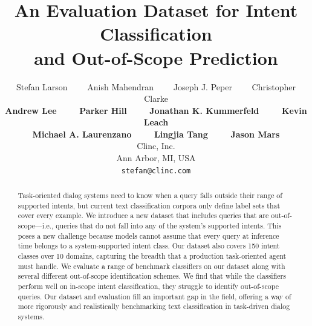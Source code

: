 \documentclass[11pt,a4paper]{article}
\title{An Evaluation Dataset for Intent Classification\\and Out-of-Scope Prediction}
\author{Stefan Larson ~~~~Anish Mahendran ~~~~Joseph J. Peper ~~~~Christopher Clarke\\ \textbf{Andrew Lee ~~~~Parker Hill ~~~~Jonathan K. Kummerfeld ~~~~Kevin Leach}\\
\textbf{Michael A. Laurenzano ~~~~Lingjia Tang ~~~~Jason Mars}\\
  Clinc, Inc.\\
  Ann Arbor, MI, USA \\
  {\tt stefan@clinc.com}
  \\}
\date{}
\begin{document}
\maketitle
\begin{abstract}
Task-oriented dialog systems need to know when a query falls outside their range of supported intents, but current text classification corpora only define label sets that cover every example.
We introduce a new dataset that includes queries that are out-of-scope---i.e., queries that do not fall into any of the system's supported intents. This poses a new challenge because models cannot assume that every query at inference time belongs to a system-supported intent class.
Our dataset also covers 150 intent classes over 10 domains, capturing the breadth that a production task-oriented agent must handle.
We evaluate a range of benchmark classifiers on our dataset along with several different out-of-scope identification schemes.
We find that while the classifiers perform well on in-scope intent classification, they struggle to identify out-of-scope queries.
Our dataset and evaluation fill an important gap in the field, offering a way of more rigorously and realistically benchmarking text classification in task-driven dialog systems.
\end{abstract}
\end{document}
